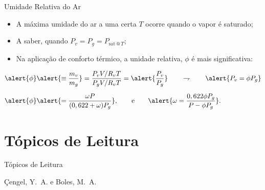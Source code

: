     \begin{frame}{Umidade Relativa do Ar}\vspace*{-0em}
        \begin{itemize}
            \item<1-> A máxima umidade do ar a uma certa $T$ ocorre quando o vapor é
                \alert{saturado};
            \item<1-> A saber, quando \alert{$P_v = P_g = P_{\mathrm{sat}\,@\,T}$};
            \item<1-> Na aplicação de \alert{conforto térmico}, a \alert{unidade relativa},
                \alert{$\phi$} é mais significativa:
        \end{itemize}
        \begin{align*}
            \alert{\phi} &
            \alert{\equiv \frac{m_v}{m_g}}
            =\frac{P_vV/R_vT}{P_gV/R_vT} = \alert{\frac{P_v}{P_g}}
            \qquad\rightharpoondown\qquad
            \alert{P_v = \phi P_g}
            \\[\medskipamount]
            \alert{\phi} &
            \alert{=\frac{\omega P}{(0,622+\omega)P_g}},
            \qquad\mbox{e}\qquad
            \alert{\omega=\frac{0,622\phi P_g}{P-\phi P_g}}.
        \end{align*}
    \end{frame}

\section{Tópicos de Leitura}

    \begin{frame}[allowframebreaks]{Tópicos de Leitura}
        \begin{thebibliography}{Çengel, Y.~A., 2013}
                Çengel, Y.~A. e Boles, M.~A.
        \end{thebibliography}
    \end{frame}




